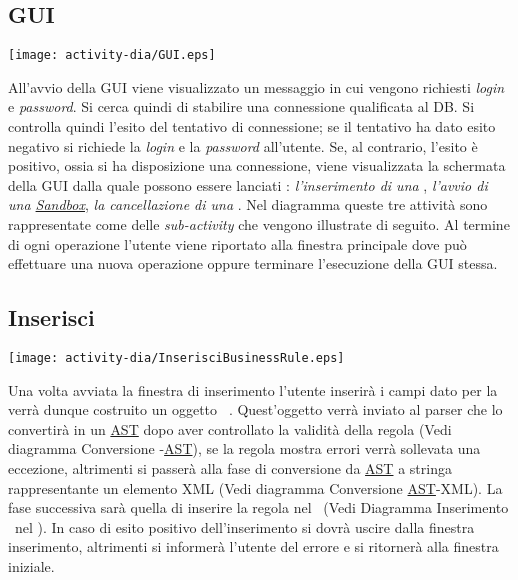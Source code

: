 \subsection{GUI}
\begin{center}
 \texttt{[image: activity-dia/GUI.eps]}
\end{center}
All'avvio della GUI viene visualizzato un messaggio in cui vengono richiesti \textit{login} e \textit{password}. Si cerca quindi di stabilire una connessione qualificata al DB. 
Si controlla quindi l'esito del tentativo di connessione; se il tentativo ha dato esito negativo si richiede la \textit{login} e la
 \textit{password} all'utente. Se, al contrario, l'esito \`e positivo, ossia si ha disposizione una connessione, viene visualizzata la schermata della GUI dalla quale  possono essere lanciati :\textit{ l'inserimento di una \br}, \textit{l'avvio di una \underline{Sandbox}}, \textit{la cancellazione di una \br}.
Nel diagramma queste tre attivit\`a sono rappresentate come delle \textit{sub-activity} che vengono illustrate di seguito. Al termine di ogni operazione l'utente viene riportato alla finestra principale dove pu\`o effettuare una nuova operazione oppure terminare l'esecuzione della GUI stessa.

\subsection{Inserisci \br}
\begin{center}
 \texttt{[image: activity-dia/InserisciBusinessRule.eps]}
\end{center}

Una volta avviata la finestra di inserimento l'utente inserir\`a i campi dato per la \br\, verr\`a dunque costruito un oggetto \textit{\BR\ }. Quest'oggetto verr\`a inviato al parser che lo convertir\`a in un \underline{AST} dopo aver controllato la validit\`a della regola (Vedi diagramma Conversione \br -\underline{AST}), se la regola mostra errori verr\`a sollevata una eccezione, altrimenti si passer\`a alla fase di conversione da \underline{AST} a stringa rappresentante un elemento XML (Vedi diagramma Conversione \underline{AST}-XML). La fase successiva sar\`a quella di inserire la regola nel \rp\ (Vedi Diagramma Inserimento \br\ nel \rp). In caso di esito positivo dell'inserimento si dovr\`a uscire dalla finestra inserimento, altrimenti si informer\`a l'utente del errore e si ritorner\`a alla finestra iniziale.

